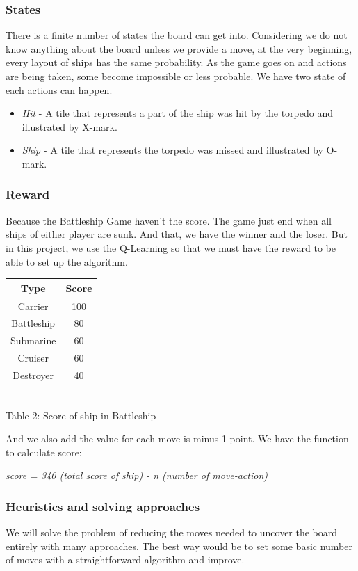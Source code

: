 \documentclass{article}
\begin{document}
\begin{multicols}{2}
\subsubsection{States}
There is a finite number of states the board can get into. Considering we do not know anything about the board unless we provide a move, at the very beginning, every layout of ships has the same probability. As the game goes on and actions are being taken, some become impossible or less probable. We have two state of each actions can happen.
\begin{itemize}
  \item \textit{Hit} - A tile that represents a part of the ship was hit by the torpedo and illustrated by X-mark.
  \item \textit{Ship} - A tile that represents the torpedo was missed and illustrated by O-mark.
\end{itemize}
\subsubsection{Reward}
Because the Battleship Game haven't the score. The game just end when all ships of either player are sunk. And that, we have the winner and the loser. But in this project, we use the Q-Learning so that we must have the reward to be able to set up the algorithm.
 \begin{center}
\begin{tabular}{|c | c|} 
 \hline
 \textbf{Type} & \textbf{Score}\\ [0.5ex] 
 \hline
 Carrier & 100 \\ 
 \hline
 Battleship & 80\\
 \hline
 Submarine & 60\\
 \hline
 Cruiser & 60\\
 \hline
 Destroyer & 40\\
 \hline
 \hline 
\end{tabular}
\\[1.5ex]Table 2: Score of ship in Battleship
\end{center}
And we also add the value for each move is minus 1 point. We have the function to calculate score:
\begin{center}
\textit{score = 340 (total score of ship) - n (number of move-action)}
\end{center}
\subsubsection{Heuristics and solving approaches}
We will solve the problem of reducing the moves needed to uncover
the board entirely with many approaches. The best way would be to
set some basic number of moves with a straightforward algorithm and improve.


\end{multicols}
\end{document}
